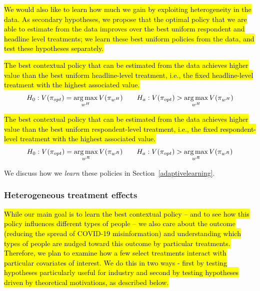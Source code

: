 \documentclass[letterpaper, 12pt, parskip=full,]{scrartcl}
\begin{document}
\hl{We would also like to learn how much we gain by exploiting heterogeneity in the data. As secondary hypotheses, we propose that the optimal policy that we are able to estimate from the data improves over the best uniform respondent and headline level treatments; we learn these best uniform policies from the data, and test these hypotheses separately. }
\setcounter{hypothesis}{2}
  \begin{subhyp}
  \hl{The best contextual policy that can be estimated from the data achieves higher value than the best uniform headline-level treatment, i.e., the fixed headline-level treatment with the highest associated value. }
  \label{eq:optheadline}
\begin{align}
  H_{0}: V(\pi_{opt}) = \operatorname*{arg\,max}_{w^H} V(\pi_{w^H}) \qquad H_{a}:  V(\pi_{opt}) > \operatorname*{arg\,max}_{w^H} V(\pi_{w^H})
\end{align}
\end{subhyp}

  \begin{subhyp}
 \hl{ The best contextual policy that can be estimated from the data achieves higher value than the best uniform respondent-level treatment, i.e., the fixed respondent-level treatment with the highest associated value. }
\begin{align}
  H_{0}: V(\pi_{opt}) = \operatorname*{arg\,max}_{w^R} V(\pi_{w^R}) \qquad H_{a}:  V(\pi_{opt}) > \operatorname*{arg\,max}_{w^R} V(\pi_{w^R})
\end{align}
\end{subhyp}

We discuss how we \textit{learn} these policies in Section~\ref{adaptivelearning}. 


\subsubsection{Heterogeneous treatment effects}\label{policieshte}

\hl{While our main goal is to learn the best contextual policy -- and to see how this policy influences different types of people -- we also care about the outcome (reducing the spread of COVID-19 misinformation) and understanding which types of people are nudged toward this outcome by particular treatments. Therefore, we plan to examine how a few select treatments interact with particular covariates of interest. We do this in two ways - first by testing hypotheses particularly useful for industry and second by testing hypotheses driven by theoretical motivations, as described below.}
\end{document}
